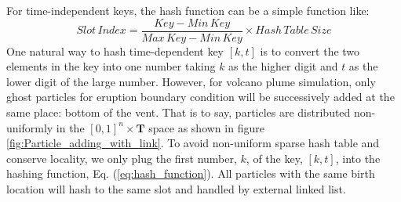 \documentclass[procedia]{easychair}
\begin{document}
For time-independent keys, the hash function can be a simple function like:
\begin{equation}
Slot\,Index= \frac{Key - Min\,Key}{Max\,Key - Min\,Key} 
\times Hash\,Table\,Size 
\label{eq:hash_function}
\end{equation}
One natural way to hash time-dependent key $[k,t]$ is to convert the two elements in the key into one number taking $k$ as the higher digit and $t$ as the lower digit of the large number. However, for volcano plume simulation, only ghost particles for eruption boundary condition will be successively added at the same place: bottom of the vent. That is to say, particles are distributed non-uniformly in the $[0,1]^n \times \textbf{T}$ space as shown in figure \ref{fig:Particle_adding_with_link}. To avoid non-uniform sparse hash table and conserve locality, we only plug the first number, $k$, of the key, $[k,t]$, into the hashing function, Eq. (\ref{eq:hash_function}). All particles with the same birth location will hash to the same slot and handled by external linked list.
\end{document}
